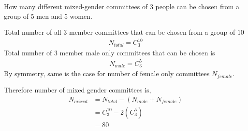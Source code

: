 
%
%
%
%
% 
% 

\question[4] How many different mixed-gender committees of 3 people can be chosen from a group of $5$ men and $5$ women.


\ifprintanswers
\fi 

\begin{solution}[\halfpage]
  Total number of all $3$ member committees that can be chosen from a group of $10$
  \begin{align}
    N_{total} = C^{10}_3 \nonumber
  \end{align}
  Total number of $3$ member male only committees that can be chosen is
  \begin{align}
    N_{male} = C^{5}_3 \nonumber
  \end{align}
  By symmetry, same is the case for number of female only committees $N_{female}$.
  
  Therefore number of mixed gender committees is,
  \begin{align}
    N_{mixed} &= N_{total} - (N_{male}+N_{female}) \nonumber \\
              &= C^{10}_3 - 2(C^5_3) \nonumber \\
              &= 80 \nonumber
  \end{align}
\end{solution}

